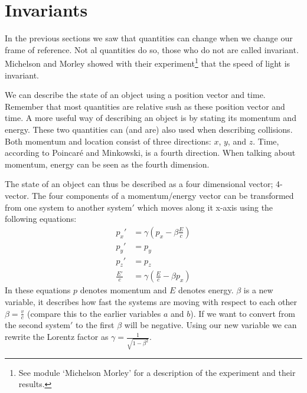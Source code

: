 \section{Invariants}
In the previous sections we saw that quantities can change when we change our frame of reference. Not al quantities do so, those who do not are called invariant. Michelson and Morley showed with their experiment\footnote{See module `Michelson  Morley' for a description of the experiment and their results.} that the speed of light is invariant.

We can describe the state of an object using a position vector and time. Remember that most quantities are relative sush as these position vector and time. A more useful way of describing an object is by stating its momentum and energy. These two quantities can (and are) also used when describing collisions. Both momentum and location consist of three directions: $x$, $y$, and $z$. Time, according to Poincar\'e and Minkowski, is a fourth direction. When talking about momentum, energy can be seen as the fourth dimension.

The state of an object can thus be described as a four dimensional vector; 4-vector. The four components of a momentum/energy vector can be transformed from one system to another system$'$ which moves along it x-axis using the following equations:
\begin{equation}\label{eq:invar1}\begin{aligned}
p_x' &= \gamma \left( p_x - \beta \frac{E}{c} \right)  \\
p_y' &= p_y \\
p_z' &= p_z \\
\frac{E'}{c} &= \gamma \left( \frac{E}{c} - \beta p_x \right) 
\end{aligned}\end{equation}
In these equations $p$ denotes momentum and $E$ denotes energy. $\beta$ is a new variable, it describes how fast the systems are moving with respect to each other $\beta = \frac{v}{c}$ (compare this to the earlier variables $a$ and $b$). If we want to convert from the second system$'$ to the first $\beta$ will be negative. Using our new variable we can rewrite the Lorentz factor as $\gamma = \frac{1}{\sqrt{1-\beta^2}}$.

